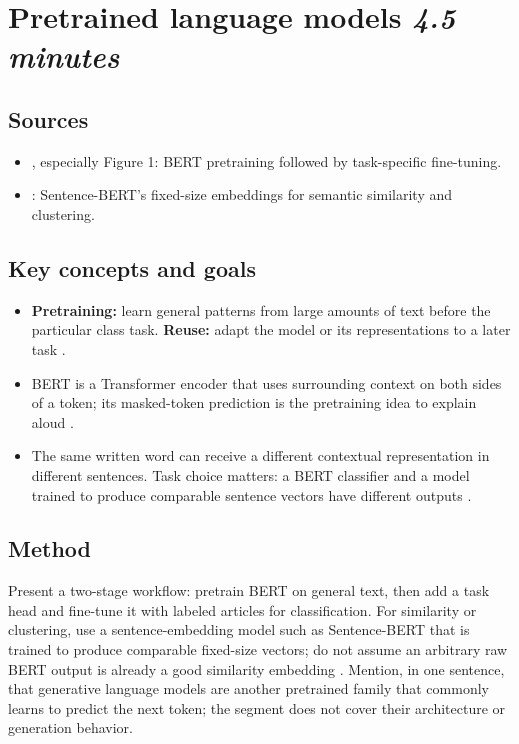 \documentclass[11pt]{article}
\begin{document}
\clearpage
\section[Pretrained language models]{Pretrained language models \hfill\normalsize\textit{4.5 minutes}}

\subsection*{Sources}
\begin{itemize}
  \item \textcite{devlin2019}, especially Figure 1: BERT pretraining followed by task-specific fine-tuning.
  \item \textcite{reimers2019}: Sentence-BERT's fixed-size embeddings for semantic similarity and clustering.
\end{itemize}

\subsection*{Key concepts and goals}
\begin{itemize}
  \item \textbf{Pretraining:} learn general patterns from large amounts of text before the particular class task. \textbf{Reuse:} adapt the model or its representations to a later task \parencite{devlin2019}.
  \item BERT is a Transformer encoder that uses surrounding context on both sides of a token; its masked-token prediction is the pretraining idea to explain aloud \parencite{devlin2019}.
  \item The same written word can receive a different contextual representation in different sentences. Task choice matters: a BERT classifier and a model trained to produce comparable sentence vectors have different outputs \parencite{devlin2019,reimers2019}.
\end{itemize}

\subsection*{Method}
Present a two-stage workflow: pretrain BERT on general text, then add a task head and fine-tune it with labeled articles for classification. For similarity or clustering, use a sentence-embedding model such as Sentence-BERT that is trained to produce comparable fixed-size vectors; do not assume an arbitrary raw BERT output is already a good similarity embedding \parencite{devlin2019,reimers2019}. Mention, in one sentence, that generative language models are another pretrained family that commonly learns to predict the next token; the segment does not cover their architecture or generation behavior.
\end{document}
